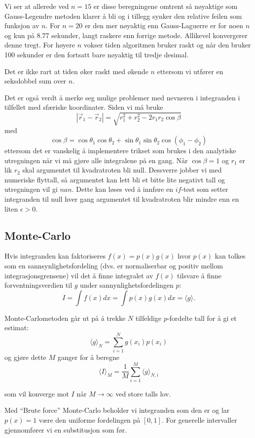 \documentclass[norsk, 12pt]{article}
\newcommand{\f}{\frac}
\newcommand{\vr}{\vec{r}}
\begin{document}
Vi ser at allerede ved $n=15$ er disse beregningene omtrent så nøyaktige som Gauss-Legendre metoden klarer å bli og i
tillegg synker den relative feilen som funksjon av $n$. For $n=20$ er den mer nøyaktig enn Gauss-Laguerre er for noen $n$
og kun på 8.77 sekunder, langt raskere enn forrige metode. Allikevel konvergerer denne tregt. For høyere $n$ vokser
tiden algoritmen bruker raskt og når den bruker 100 sekunder er den fortsatt bare nøyaktig til tredje desimal.

Det er ikke rart at tiden øker raskt med økende $n$ ettersom vi utfører en seksdobbel sum over $n$.

Det er også verdt å merke seg mulige problemer med nevneren i integranden i tilfellet med sfæriske koordinater. Siden
vi må bruke
$$|\vr_1-\vr_2| = \sqrt{r_1^2+r_2^2-2r_1r_2\cos\beta}$$
med $$\cos\beta = \cos\theta_1\cos\theta_2 +\sin\theta_1\sin\theta_2\cos(\phi_1-\phi_2)$$
ettersom det er vanskelig å implementere trikset som brukes i den analytiske utregningen når vi må gjøre alle integralene
på en gang. Når $\cos\beta = 1$ og $r_1$ er lik $r_2$ skal argumentet til kvadratroten bli null. Dessverre jobber vi med
numeriske flyttall, så argumentet kan lett bli et bitte lite negativt tall og utregningen vil gi $nan$. Dette kan løses
ved å innføre en $if$-test som setter integranden til null hver gang argumentet til kvadratroten blir mindre enn
en liten $\epsilon>0$.

\subsection{Monte-Carlo}
Hvis integranden kan faktoriseres $f(x) = p(x)g(x)$ hvor $p(x)$ kan tolkes som en sannsynlighetsfordeling (dvs. er normaliserbar
og positiv mellom integrasjonsgrensene) vil det å finne
integralet av $f(x)$ tilsvare å finne forventningsverdien til $g$ under sannynlighetsfordelingen $p$:
$$I = \int f(x)dx = \int p(x)g(x) dx = \langle g \rangle.$$

Monte-Carlometoden går ut på å trekke $N$ tilfeldige $p$-fordelte tall for å gi et estimat:
$$\langle g\rangle_N = \sum\limits_{i=1}^Ng(x_i)p(x_i)$$
og gjøre dette $M$ ganger for å beregne
$$\langle I\rangle_M = \f{1}{M}\sum\limits_{i=1}^{M}\langle g\rangle_{N,i}$$

som vil konverge mot $I$ når $M\rightarrow \infty$ ved store talls lov.

Med ``Brute force'' Monte-Carlo beholder vi integranden som den er og lar $p(x)=1$ være den uniforme fordelingen
på $[0,1]$. For generelle intervaller gjennomfører vi en substitusjon som før.
\end{document}
